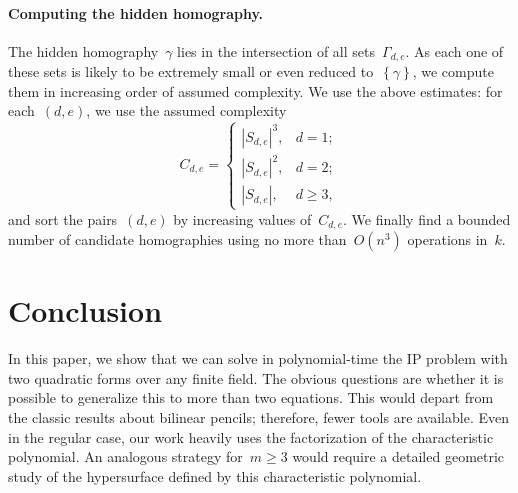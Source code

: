 \documentclass{lms}
\def\acco#1{\left\{#1\right\}}
\def\abs#1{\left|#1\right|}
\def\card#1{\abs{#1}}
\begin{document}
\paragraph{Computing the hidden homography.}

The hidden homography~$γ$ lies in the intersection of all sets~$Γ_{d,e}$.
As each one of these sets is likely to be extremely small or even reduced
to~$\acco{γ}$, we compute them in increasing order of assumed complexity.
We use the above estimates: for each~$(d,e)$, we use the assumed complexity
\begin{equation}
C_{d,e} = \begin{cases}
\card{S_{d,e}}^3,& d = 1;\\
\card{S_{d,e}}^2,& d = 2;\\
\card{S_{d,e}},& d≥ 3,
\end{cases}
\end{equation}
and sort the pairs~$(d,e)$ by increasing values of~$C_{d,e}$. We finally
find a bounded number of candidate homographies using no more
than~$O(n^3)$ operations in~$k$.

\section*{Conclusion}

In this paper, we show that we can solve in polynomial-time the IP
problem with two quadratic forms over any finite field.
The obvious questions are whether it is possible to generalize this to
more than two equations.
This would depart from the classic results about bilinear pencils;
therefore, fewer tools are available.
Even in the regular case, our work heavily uses the factorization of
the characteristic polynomial.
An analogous strategy for~$m ≥ 3$ would require a detailed
geometric study of the hypersurface defined by this characteristic
polynomial.
\end{document}
